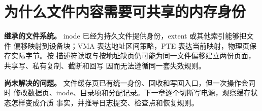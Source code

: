 \chapter{为什么文件内容需要可共享的内存身份}

\begin{statebox}
\textbf{继承的文件系统。} inode 已经为持久文件提供身份，extent 或其他索引能够把文件
偏移映射到设备块；VMA 表达地址区间策略，PTE 表达当前映射，物理页保存实际字节。按
描述符读取与按地址缺页仍可能为同一文件偏移建立两份页面，共享写、私有复制、截断和回写
因而无法遵循同一套失效规则。
\end{statebox}


\begin{problemframe}
\textbf{尚未解决的问题。} 文件缓存页已有统一身份、回收和写回入口，但一次操作会同时
修改数据页、inode、目录项和分配记录。下一章逐个切断写电源，观察缓存状态怎样变成介质
事实，并推导日志提交、检查点和恢复规则。
\end{problemframe}
